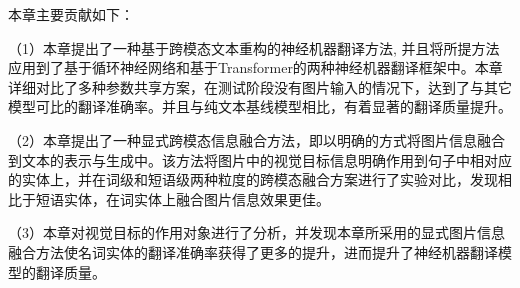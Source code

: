 本章主要贡献如下：

（1）本章提出了一种基于跨模态文本重构的神经机器翻译方法, 并且将所提方法应用到了基于循环神经网络和基于Transformer的两种神经机器翻译框架中。本章详细对比了多种参数共享方案，在测试阶段没有图片输入的情况下，达到了与其它模型可比的翻译准确率。并且与纯文本基线模型相比，有着显著的翻译质量提升。

（2）本章提出了一种显式跨模态信息融合方法，即以明确的方式将图片信息融合到文本的表示与生成中。该方法将图片中的视觉目标信息明确作用到句子中相对应的实体上，并在词级和短语级两种粒度的跨模态融合方案进行了实验对比，发现相比于短语实体，在词实体上融合图片信息效果更佳。

（3）本章对视觉目标的作用对象进行了分析，并发现本章所采用的显式图片信息融合方法使名词实体的翻译准确率获得了更多的提升，进而提升了神经机器翻译模型的翻译质量。
